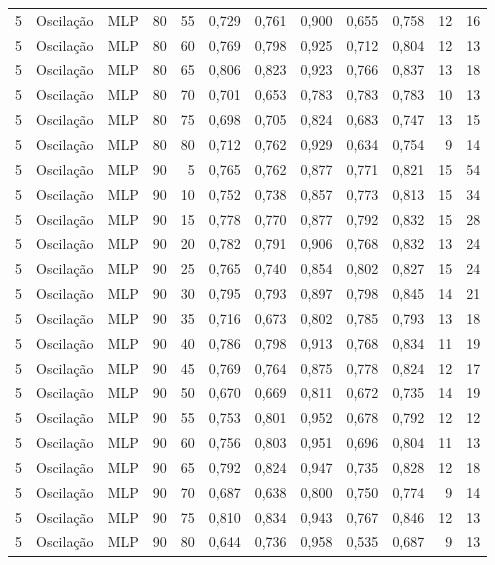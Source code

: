 \begin{longtable}{ccclrrrrrrrr}
5 & Oscilação & MLP & 80 & 55 & 0,729 & 0,761 & 0,900 & 0,655 & 0,758 & 12 & 16 \\
5 & Oscilação & MLP & 80 & 60 & 0,769 & 0,798 & 0,925 & 0,712 & 0,804 & 12 & 13 \\
5 & Oscilação & MLP & 80 & 65 & 0,806 & 0,823 & 0,923 & 0,766 & 0,837 & 13 & 18 \\
5 & Oscilação & MLP & 80 & 70 & 0,701 & 0,653 & 0,783 & 0,783 & 0,783 & 10 & 13 \\
5 & Oscilação & MLP & 80 & 75 & 0,698 & 0,705 & 0,824 & 0,683 & 0,747 & 13 & 15 \\
5 & Oscilação & MLP & 80 & 80 & 0,712 & 0,762 & 0,929 & 0,634 & 0,754 & 9 & 14 \\
5 & Oscilação & MLP & 90 & 5 & 0,765 & 0,762 & 0,877 & 0,771 & 0,821 & 15 & 54 \\
5 & Oscilação & MLP & 90 & 10 & 0,752 & 0,738 & 0,857 & 0,773 & 0,813 & 15 & 34 \\
5 & Oscilação & MLP & 90 & 15 & 0,778 & 0,770 & 0,877 & 0,792 & 0,832 & 15 & 28 \\
5 & Oscilação & MLP & 90 & 20 & 0,782 & 0,791 & 0,906 & 0,768 & 0,832 & 13 & 24 \\
5 & Oscilação & MLP & 90 & 25 & 0,765 & 0,740 & 0,854 & 0,802 & 0,827 & 15 & 24 \\
5 & Oscilação & MLP & 90 & 30 & 0,795 & 0,793 & 0,897 & 0,798 & 0,845 & 14 & 21 \\
5 & Oscilação & MLP & 90 & 35 & 0,716 & 0,673 & 0,802 & 0,785 & 0,793 & 13 & 18 \\
5 & Oscilação & MLP & 90 & 40 & 0,786 & 0,798 & 0,913 & 0,768 & 0,834 & 11 & 19 \\
5 & Oscilação & MLP & 90 & 45 & 0,769 & 0,764 & 0,875 & 0,778 & 0,824 & 12 & 17 \\
5 & Oscilação & MLP & 90 & 50 & 0,670 & 0,669 & 0,811 & 0,672 & 0,735 & 14 & 19 \\
5 & Oscilação & MLP & 90 & 55 & 0,753 & 0,801 & 0,952 & 0,678 & 0,792 & 12 & 12 \\
5 & Oscilação & MLP & 90 & 60 & 0,756 & 0,803 & 0,951 & 0,696 & 0,804 & 11 & 13 \\
5 & Oscilação & MLP & 90 & 65 & 0,792 & 0,824 & 0,947 & 0,735 & 0,828 & 12 & 18 \\
5 & Oscilação & MLP & 90 & 70 & 0,687 & 0,638 & 0,800 & 0,750 & 0,774 & 9 & 14 \\
5 & Oscilação & MLP & 90 & 75 & 0,810 & 0,834 & 0,943 & 0,767 & 0,846 & 12 & 13 \\
5 & Oscilação & MLP & 90 & 80 & 0,644 & 0,736 & 0,958 & 0,535 & 0,687 & 9 & 13 \\

\end{longtable}
